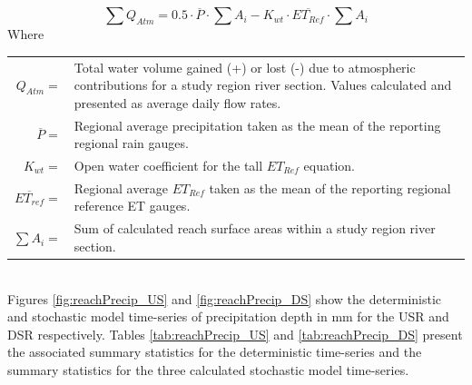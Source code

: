 \begin{linenumbers}
\begin{equation}
\sum Q_{Atm} = 0.5 \cdot \overline{P} \cdot \sum A_{i} - K_{wt} \cdot \overline{ET_{Ref}} \cdot \sum A_{i}
\label{eq:atm4}
\end{equation}
Where\\
\begin{tabular}{r p{5.5in}}
	$Q_{Atm} =$&Total water volume gained (+) or lost (-) due to atmospheric contributions for a study region river section. Values calculated and presented as average daily flow rates.\\
	$\overline{P} =$&Regional average precipitation taken as the mean of the reporting regional rain gauges.\\
	$K_{wt} =$& Open water coefficient for the tall $ET_{Ref}$ equation.\\
	$\overline{ET_{ref}} =$&Regional average $ET_{Ref}$ taken as the mean of the reporting regional reference ET gauges.\\
	$\sum A_{i}=$&Sum of calculated reach surface areas within a study region river section. \\
\end{tabular}\\

Figures \ref{fig:reachPrecip_US} and \ref{fig:reachPrecip_DS} show the deterministic and stochastic model time-series of precipitation depth in \si{\milli\meter} for the USR and DSR respectively.  Tables \ref{tab:reachPrecip_US} and \ref{tab:reachPrecip_DS} present the associated summary statistics for the deterministic time-series and the summary statistics for the three calculated stochastic model time-series.


\end{linenumbers}
